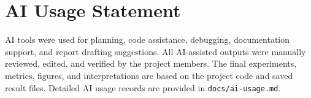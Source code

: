 \documentclass[11pt]{article}
\begin{document}
\clearpage



\clearpage
\section*{AI Usage Statement}

AI tools were used for planning, code assistance, debugging, documentation support, and report drafting suggestions. All AI-assisted outputs were manually reviewed, edited, and verified by the project members. The final experiments, metrics, figures, and interpretations are based on the project code and saved result files. Detailed AI usage records are provided in \texttt{docs/ai-usage.md}.
\end{document}

